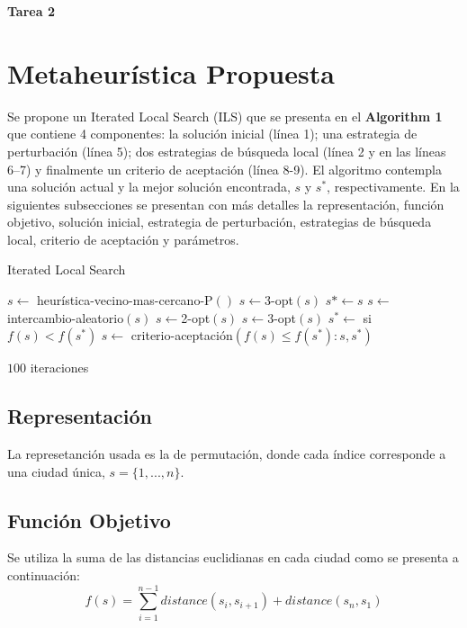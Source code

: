 \documentclass[11pt]{article}
\begin{document}
\begin{center}
\textbf{Tarea 2}
\end{center}

\section{Metaheurística Propuesta}
Se propone un Iterated Local Search (ILS) que se presenta en el \textbf{Algorithm 1} que contiene 4 componentes:
la solución inicial (línea 1); una estrategia de perturbación (línea 5); dos estrategias de búsqueda
local (línea 2 y en las líneas 6–7) y finalmente un criterio de aceptación (línea 8-9). El algoritmo
contempla una solución actual y la mejor solución encontrada, $s$ y $s^*$, respectivamente. En la siguientes
subsecciones se presentan con más detalles la representación, función objetivo, solución inicial, estrategia
de perturbación, estrategias de búsqueda local, criterio de aceptación y parámetros.
\begin{algorithm}[H]
    \caption{Iterated Local Search}
    \label{ils}
    \begin{algorithmic}[1]
    \State $s\gets $ heurística-vecino-mas-cercano-P$()$
    \State $s\gets $3-opt$(s)$
    \State $s* \gets s$
    \Repeat
        \State $s\gets $intercambio-aleatorio$(s)$
        \State $s\gets $2-opt$(s)$
        \State $s\gets $3-opt$(s)$
        \State $s^* \gets $ si $f(s) < f(s^*)$
        \State $s \gets$ criterio-aceptación$(f(s) \leq f(s^*): s,s^*)$
        
    \Until $100$ iteraciones
    \end{algorithmic}
\end{algorithm}
\subsection{Representación}
La represetanción usada es la de permutación, donde cada índice corresponde a una ciudad única,
$s = \{1, . . . , n\}$.

\subsection{Función Objetivo}
Se utiliza la suma de las distancias euclidianas en cada ciudad como se presenta a continuación:
\begin{equation}
    f(s)= \sum_{i=1}^{n-1} distance(s_i , s_{i+1}) + distance(s_n , s_1)
\end{equation}
\end{document}
